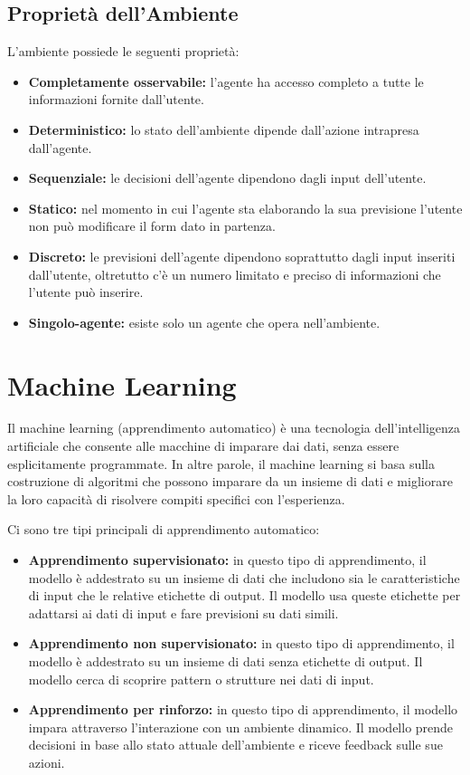 \documentclass[12pt]{article}
\begin{document}
\subsection{Proprietà dell'Ambiente}
L'ambiente possiede le seguenti proprietà:
\begin{itemize}
    \item \textbf{Completamente osservabile:} l'agente ha accesso completo a tutte le informazioni fornite dall'utente.
    \item \textbf{Deterministico:} lo stato dell'ambiente dipende dall'azione intrapresa dall'agente.
    \item \textbf{Sequenziale:} le decisioni dell'agente dipendono dagli input dell'utente.
    \item \textbf{Statico:} nel momento in cui l'agente sta elaborando la sua previsione l'utente non può modificare il form dato in partenza.
    \item \textbf{Discreto:} le previsioni dell'agente dipendono soprattutto dagli input inseriti dall'utente, oltretutto c'è un numero limitato e preciso di informazioni che l'utente può inserire.
    \item \textbf{Singolo-agente:} esiste solo un agente che opera nell'ambiente.
\end{itemize}

\newpage

\section{Machine Learning}
Il machine learning (apprendimento automatico) è una tecnologia dell'intelligenza artificiale che consente alle macchine di imparare dai dati, senza essere esplicitamente programmate. In altre parole, il machine learning si basa sulla costruzione di algoritmi che possono imparare da un insieme di dati e migliorare la loro capacità di risolvere compiti specifici con l'esperienza.

Ci sono tre tipi principali di apprendimento automatico:
\begin{itemize}
    \item \textbf{Apprendimento supervisionato:} in questo tipo di apprendimento, il modello è addestrato su un insieme di dati che includono sia le caratteristiche di input che le relative etichette di output. Il modello usa queste etichette per adattarsi ai dati di input e fare previsioni su dati simili.
    \item \textbf{Apprendimento non supervisionato:} in questo tipo di apprendimento, il modello è addestrato su un insieme di dati senza etichette di output. Il modello cerca di scoprire pattern o strutture nei dati di input.
    \item \textbf{Apprendimento per rinforzo:} in questo tipo di apprendimento, il modello impara attraverso l'interazione con un ambiente dinamico. Il modello prende decisioni in base allo stato attuale dell'ambiente e riceve feedback sulle sue azioni.
\end{itemize}
\end{document}
